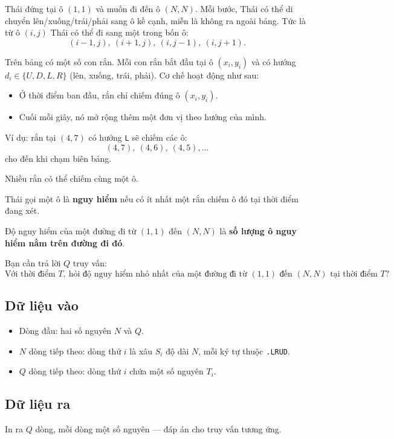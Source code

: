Thái đứng tại ô $(1,1)$ và muốn đi đến ô $(N,N)$. Mỗi bước, Thái có thể di chuyển lên/xuống/trái/phải sang ô kề cạnh, miễn là không ra ngoài bảng.  
Tức là từ ô $(i,j)$ Thái có thể đi sang một trong bốn ô:
\[
(i-1,j),\ (i+1,j),\ (i,j-1),\ (i,j+1).
\]

Trên bảng có một số con rắn.  
Mỗi con rắn bắt đầu tại ô $(x_i,y_i)$ và có hướng $d_i \in \{U, D, L, R\}$ (lên, xuống, trái, phải). Cơ chế hoạt động như sau:

\begin{itemize}
    \item Ở thời điểm ban đầu, rắn chỉ chiếm đúng ô $(x_i,y_i)$.
    \item Cuối mỗi giây, nó mở rộng thêm một đơn vị theo hướng của mình.
\end{itemize}

Ví dụ: rắn tại $(4,7)$ có hướng \texttt{L} sẽ chiếm các ô:
\[
(4,7),\ (4,6),\ (4,5),\ldots
\]
cho đến khi chạm biên bảng.

Nhiều rắn có thể chiếm cùng một ô.

Thái gọi một ô là \textbf{nguy hiểm} nếu có ít nhất một rắn chiếm ô đó tại thời điểm đang xét.

Độ nguy hiểm của một đường đi từ $(1,1)$ đến $(N,N)$ là \textbf{số lượng ô nguy hiểm nằm trên đường đi đó}.

Bạn cần trả lời $Q$ truy vấn:
\[
\text{Với thời điểm } T,\ \text{hỏi độ nguy hiểm nhỏ nhất của một đường đi từ } (1,1) \text{ đến } (N,N) \text{ tại thời điểm } T?
\]

\subsection*{Dữ liệu vào}

\begin{itemize}
    \item Dòng đầu: hai số nguyên $N$ và $Q$.
    \item $N$ dòng tiếp theo: dòng thứ $i$ là xâu $S_i$ độ dài $N$, mỗi ký tự thuộc \texttt{.LRUD}.
    \item $Q$ dòng tiếp theo: dòng thứ $i$ chứa một số nguyên $T_i$.
\end{itemize}

\subsection*{Dữ liệu ra}

In ra $Q$ dòng, mỗi dòng một số nguyên — đáp án cho truy vấn tương ứng.

